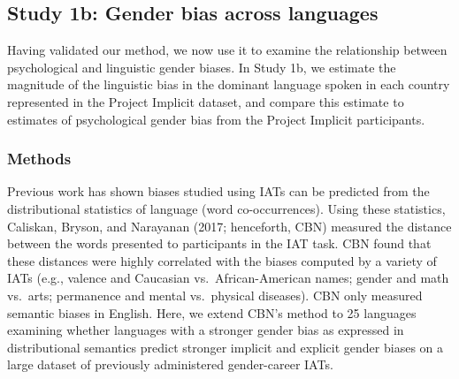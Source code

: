 \documentclass[man,floatsintext]{apa6}
\begin{document}
\hypertarget{study-1b-gender-bias-across-languages}{%
\subsection{Study 1b: Gender bias across languages}\label{study-1b-gender-bias-across-languages}}

Having validated our method, we now use it to examine the relationship between psychological and linguistic gender biases. In Study 1b, we estimate the magnitude of the linguistic bias in the dominant language spoken in each country represented in the Project Implicit dataset, and compare this estimate to estimates of psychological gender bias from the Project Implicit participants.

\hypertarget{methods-1}{%
\subsubsection{Methods}\label{methods-1}}

Previous work has shown biases studied using IATs can be predicted from the distributional statistics of language (word co-occurrences). Using these statistics, Caliskan, Bryson, and Narayanan (2017; henceforth, CBN) measured the distance between the words presented to participants in the IAT task. CBN found that these distances were highly correlated with the biases computed by a variety of IATs (e.g., valence and Caucasian vs.~African-American names; gender and math vs.~arts; permanence and mental vs.~physical diseases). CBN only measured semantic biases in English. Here, we extend CBN's method to 25 languages examining whether languages with a stronger gender bias as expressed in distributional semantics predict stronger implicit and explicit gender biases on a large dataset of previously administered gender-career IATs.
\end{document}
